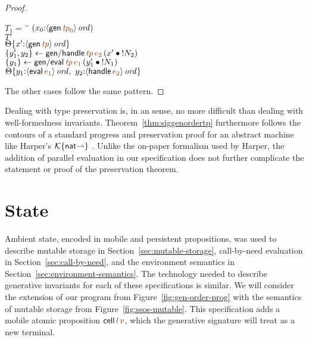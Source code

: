 \begin{proof}
\begin{description}
\begin{tabbing}
$T_1 = ~$ \= \qquad \= $(x_0{:}\istrue{\susp{{\sf gen}\,\lf{{\it tp}_0}}})$
\\
\>$T'$
\\
\>\>$\tackon{\Theta}{x'{:}\istrue{\susp{{\sf gen}\,\lf{{\it tp}}}}}$
\\
\>$\trstep{y_1',y_2}{{\sf gen/handle}\,\lf{\it tp}\,\lf{e_2}\,(\tfuser{x'}{\tbangr{N_2}})}$
\\
\>$\trstep{y_1}{{\sf gen/eval}\,\lf{\it tp}\,\lf{e_1}\,(\tfuser{y_1'}{\tbangr{N_1}})}$
\\
\>\>$\tackon{\Theta}{y_1{:}\istrue{\susp{{\sf eval}\,\lf{e_1}}}, ~
                   y_2{:}\istrue{\susp{{\sf handle}\,\lf{e_2}}}}$
\end{tabbing}


\end{description}

\noindent
The other cases follow the same pattern.
\end{proof}

Dealing with type preservation is, in an
sense, no more difficult than dealing with well-formedness
invariants. %
Theorem~\ref{thm:siggenordertp} furthermore follows the contours of a standard
progress and preservation proof for an abstract machine like Harper's
$\mathcal K\{{\sf nat}{\rightharpoonup}\}$ \cite[Chapter
27]{harper12practical}.  Unlike the on-paper formalism used by Harper,
the addition of parallel evaluation in our specification does not
further complicate the statement or proof of the preservation theorem.


\section{State}
\label{sec:gen-state}

Ambient state, encoded in mobile and persistent propositions, was used
to describe mutable storage in Section~\ref{sec:mutable-storage},
call-by-need evaluation in Section~\ref{sec:call-by-need}, and the
environment semantics in Section~\ref{sec:environment-semantics}. The
technology needed to describe generative invariants for each of these
specifications is similar. We will consider the extension of our
program from Figure~\ref{fig:gen-order-prog} with the semantics of
mutable storage from Figure~\ref{fig:ssos-mutable}. This specification
adds a mobile atomic proposition ${\sf cell}\,\lf{l}\,\lf{v}$, which
the generative signature will treat as a new terminal.

